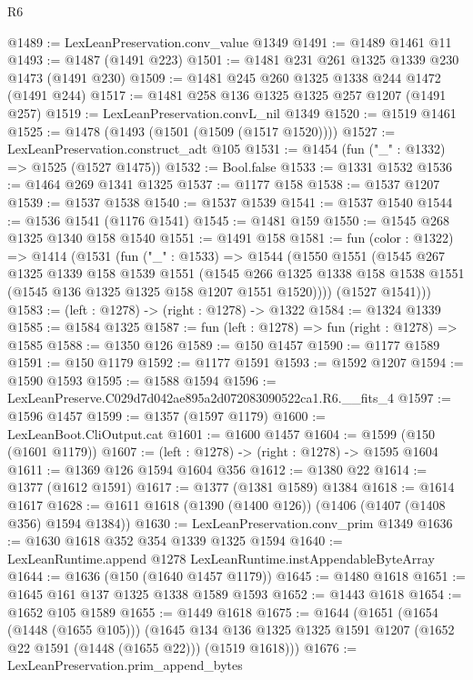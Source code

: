 \begin{lexlean}{R6}
\begin{coremodule}
@1489 := LexLeanPreservation.conv_value @1349
@1491 := @1489 @1461 @11
@1493 := @1487 (@1491 @223)
@1501 := @1481 @231 @261 @1325 @1339 @230 @1473 (@1491 @230)
@1509 := @1481 @245 @260 @1325 @1338 @244 @1472 (@1491 @244)
@1517 := @1481 @258 @136 @1325 @1325 @257 @1207 (@1491 @257)
@1519 := LexLeanPreservation.convL_nil @1349
@1520 := @1519 @1461
@1525 := @1478 (@1493 (@1501 (@1509 (@1517 @1520))))
@1527 := LexLeanPreservation.construct_adt @105
@1531 := @1454 (fun ("_" : @1332) => @1525 (@1527 @1475))
@1532 := Bool.false
@1533 := @1331 @1532
@1536 := @1464 @269 @1341 @1325
@1537 := @1177 @158
@1538 := @1537 @1207
@1539 := @1537 @1538
@1540 := @1537 @1539
@1541 := @1537 @1540
@1544 := @1536 @1541 (@1176 @1541)
@1545 := @1481 @159
@1550 := @1545 @268 @1325 @1340 @158 @1540
@1551 := @1491 @158
@1581 := fun (color : @1322) =>
  @1414
    (@1531
      (fun ("_" : @1533) =>
      @1544
        (@1550
          @1551
          (@1545
            @267
            @1325
            @1339
            @158
            @1539
            @1551
            (@1545
              @266
              @1325
              @1338
              @158
              @1538
              @1551
              (@1545 @136 @1325 @1325 @158 @1207 @1551 @1520))))
        (@1527 @1541)))
@1583 := (left : @1278) -> (right : @1278) -> @1322
@1584 := @1324 @1339
@1585 := @1584 @1325
@1587 := fun (left : @1278) => fun (right : @1278) => @1585
@1588 := @1350 @126
@1589 := @150 @1457
@1590 := @1177 @1589
@1591 := @150 @1179
@1592 := @1177 @1591
@1593 := @1592 @1207
@1594 := @1590 @1593
@1595 := @1588 @1594
@1596 := LexLeanPreserve.C029d7d042ae895a2d072083090522ca1.R6.__fits_4
@1597 := @1596 @1457
@1599 := @1357 (@1597 @1179)
@1600 := LexLeanBoot.CliOutput.cat
@1601 := @1600 @1457
@1604 := @1599 (@150 (@1601 @1179))
@1607 := (left : @1278) -> (right : @1278) -> @1595 @1604
@1611 := @1369 @126 @1594 @1604 @356
@1612 := @1380 @22
@1614 := @1377 (@1612 @1591)
@1617 := @1377 (@1381 @1589) @1384
@1618 := @1614 @1617
@1628 := @1611 @1618 (@1390 (@1400 @126)) (@1406 (@1407 (@1408 @356) @1594 @1384))
@1630 := LexLeanPreservation.conv_prim @1349
@1636 := @1630 @1618 @352 @354 @1339 @1325 @1594
@1640 := LexLeanRuntime.append @1278 LexLeanRuntime.instAppendableByteArray
@1644 := @1636 (@150 (@1640 @1457 @1179))
@1645 := @1480 @1618
@1651 := @1645 @161 @137 @1325 @1338 @1589 @1593
@1652 := @1443 @1618
@1654 := @1652 @105 @1589
@1655 := @1449 @1618
@1675 := @1644
    (@1651
      (@1654 (@1448 (@1655 @105)))
      (@1645 @134 @136 @1325 @1325 @1591 @1207 (@1652 @22 @1591 (@1448 (@1655 @22))) (@1519 @1618)))
@1676 := LexLeanPreservation.prim_append_bytes

\end{coremodule}
\end{lexlean}
